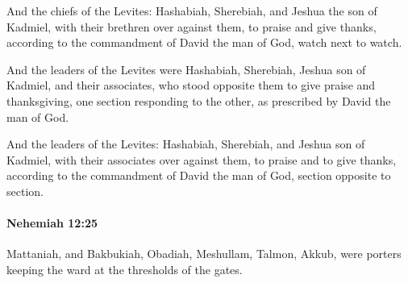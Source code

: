 			\begin{versebox}
					\item[BHS] 
					\item[LXX] 
					\item[ASV] And the chiefs of the Levites: Hashabiah, Sherebiah, and Jeshua the son of Kadmiel, with their brethren over against them, to praise and give thanks, according to the commandment of David the man of God, watch next to watch.
					\item[NIV] And the leaders of the Levites were Hashabiah, Sherebiah, Jeshua son of Kadmiel, and their associates, who stood opposite them to give praise and thanksgiving, one section responding to the other, as prescribed by David the man of God.
					\item[NRSV] And the leaders of the Levites: Hashabiah, Sherebiah, and Jeshua son of Kadmiel, with their associates over against them, to praise and to give thanks, according to the commandment of David the man of God, section opposite to section.
			\end{versebox}

		\paragraph{Nehemiah 12:25} %
			\label{NEHEMIAH-12-25}

			Mattaniah, and Bakbukiah, Obadiah, Meshullam, Talmon, Akkub, were porters keeping the ward at the thresholds of the gates.

